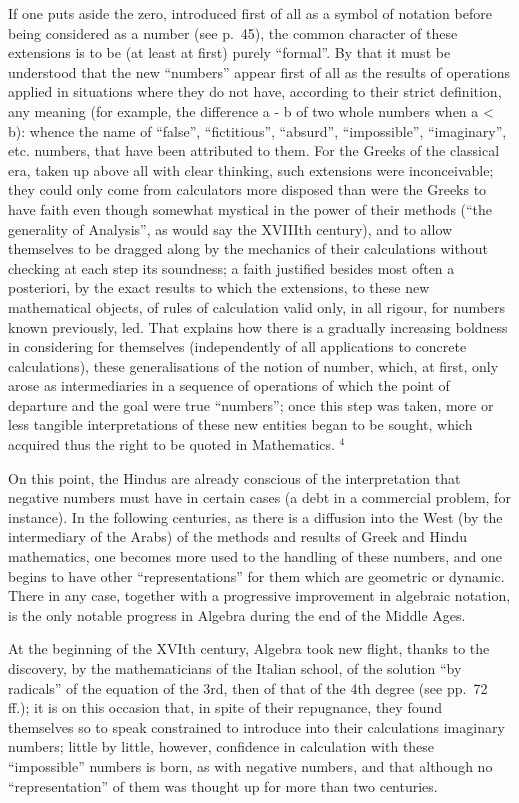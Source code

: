 If one puts aside the zero, introduced first of all as a symbol of notation before being considered as a number (see p.~45), the common character of these extensions is to be (at least at first) purely ``formal''. By that it must be understood that the new ``numbers'' appear first of all as the results of operations applied in situations where they do not have, according to their strict definition, any meaning (for example, the difference a - b of two whole numbers when a \textless{} b): whence the name of ``false'', ``fictitious'', ``absurd'', ``impossible'', ``imaginary'', etc. numbers, that have been attributed to them. For the Greeks of the classical era, taken up above all with clear thinking, such extensions were inconceivable; they could only come from calculators more disposed than were the Greeks to have faith even though somewhat mystical in the power of their methods (``the generality of Analysis'', as would say the XVIIIth century), and to allow themselves to be dragged along by the mechanics of their calculations without checking at each step its soundness; a faith justified besides most often a posteriori, by the exact results to which the extensions, to these new mathematical objects, of rules of calculation valid only, in all rigour, for numbers known previously, led. That explains how there is a gradually increasing boldness in considering for themselves (independently of all applications to concrete calculations), these generalisations of the notion of number, which, at first, only arose as intermediaries in a sequence of operations of which the point of departure and the goal were true ``numbers''; once this step was taken, more or less tangible interpretations of these new entities began to be sought, which acquired thus the right to be quoted in Mathematics. \(^{4}\)

On this point, the Hindus are already conscious of the interpretation that negative numbers must have in certain cases (a debt in a commercial problem, for instance). In the following centuries, as there is a diffusion into the West (by the intermediary of the Arabs) of the methods and results of Greek and Hindu mathematics, one becomes more used to the handling of these numbers, and one begins to have other ``representations'' for them which are geometric or dynamic. There in any case, together with a progressive improvement in algebraic notation, is the only notable progress in Algebra during the end of the Middle Ages.

At the beginning of the XVIth century, Algebra took new flight, thanks to the discovery, by the mathematicians of the Italian school, of the solution ``by radicals'' of the equation of the 3rd, then of that of the 4th degree (see pp.~72 ff.); it is on this occasion that, in spite of their repugnance, they found themselves so to speak constrained to introduce into their calculations imaginary numbers; little by little, however, confidence in calculation with these ``impossible'' numbers is born, as with negative numbers, and that although no ``representation'' of them was thought up for more than two centuries.

